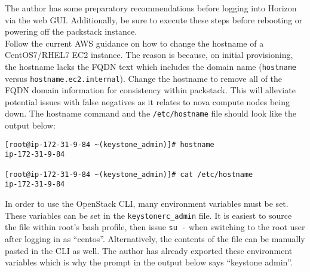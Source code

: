 The author has some preparatory recommendations before logging into Horizon
via the web GUI. Additionally, be sure to execute these steps before rebooting
or powering off the packstack instance. \\

Follow the current AWS guidance on how to change the hostname of a
CentOS7/RHEL7 EC2 instance. The reason is because, on initial provisioning,
the hostname lacks the FQDN text which includes the domain name (\verb|hostname|
versus \verb|hostname.ec2.internal|). Change the hostname to remove all of the
FQDN domain information for consistency within packstack. This will alleviate
potential issues with false negatives as it relates to nova compute nodes
being down. The hostname command and the \verb|/etc/hostname| file should look
like the output below:

\begin{verbatim}
[root@ip-172-31-9-84 ~(keystone_admin)]# hostname
ip-172-31-9-84

[root@ip-172-31-9-84 ~(keystone_admin)]# cat /etc/hostname
ip-172-31-9-84
\end{verbatim}

In order to use the OpenStack CLI, many environment variables must be set.
These variables can be set in the \verb|keystonerc_admin| file. It is easiest
to source the file within root’s bash profile, then issue \verb|su -| when
switching to the root user after logging in as ``centos''. Alternatively, the
contents of the file can be manually pasted in the CLI as well. The author has
already exported these environment variables which is why the prompt in the
output below says ``keystone admin''.

